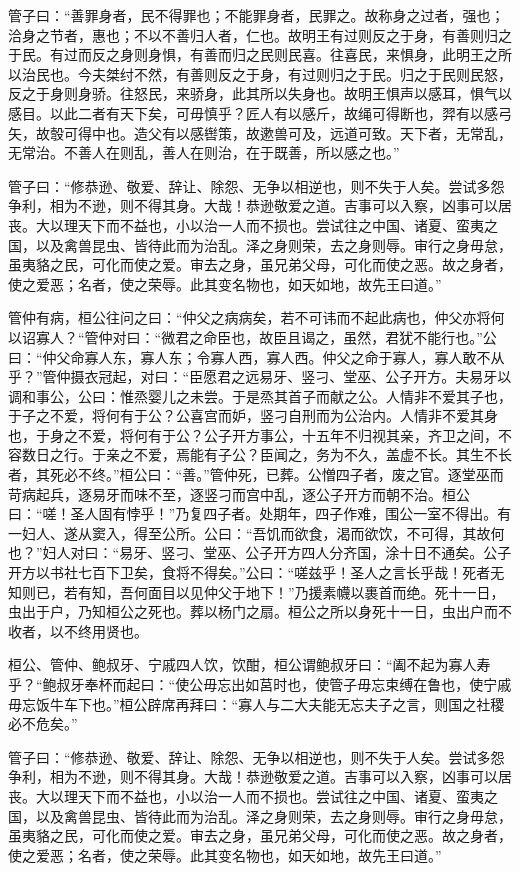 \documentclass[]{article}
\begin{document}
管子曰：``善罪身者，民不得罪也；不能罪身者，民罪之。故称身之过者，强也；洽身之节者，惠也；不以不善归人者，仁也。故明王有过则反之于身，有善则归之于民。有过而反之身则身惧，有善而归之民则民喜。往喜民，来惧身，此明王之所以治民也。今夫桀纣不然，有善则反之于身，有过则归之于民。归之于民则民怒，反之于身则身骄。往怒民，来骄身，此其所以失身也。故明王惧声以感耳，惧气以感目。以此二者有天下矣，可毋慎乎？匠人有以感斤，故绳可得断也，羿有以感弓矢，故彀可得中也。造父有以感辔策，故遬兽可及，远道可致。天下者，无常乱，无常治。不善人在则乱，善人在则治，在于既善，所以感之也。''

管子曰：``修恭逊、敬爱、辞让、除怨、无争以相逆也，则不失于人矣。尝试多怨争利，相为不逊，则不得其身。大哉！恭逊敬爱之道。吉事可以入察，凶事可以居丧。大以理天下而不益也，小以治一人而不损也。尝试往之中国、诸夏、蛮夷之国，以及禽兽昆虫、皆待此而为治乱。泽之身则荣，去之身则辱。审行之身毋怠，虽夷貉之民，可化而使之爱。审去之身，虽兄弟父母，可化而使之恶。故之身者，使之爱恶；名者，使之荣辱。此其变名物也，如天如地，故先王曰道。''

管仲有病，桓公往问之曰：``仲父之病病矣，若不可讳而不起此病也，仲父亦将何以诏寡人？``管仲对曰：``微君之命臣也，故臣且谒之，虽然，君犹不能行也。''公曰：``仲父命寡人东，寡人东；令寡人西，寡人西。仲父之命于寡人，寡人敢不从乎？''管仲摄衣冠起，对曰：``臣愿君之远易牙、竖刁、堂巫、公子开方。夫易牙以调和事公，公曰：惟烝婴儿之未尝。于是烝其首子而献之公。人情非不爱其子也，于子之不爱，将何有于公？公喜宫而妒，竖刁自刑而为公治内。人情非不爱其身也，于身之不爱，将何有于公？公子开方事公，十五年不归视其亲，齐卫之间，不容数日之行。于亲之不爱，焉能有子公？臣闻之，务为不久，盖虚不长。其生不长者，其死必不终。''桓公曰：``善。''管仲死，已葬。公憎四子者，废之官。逐堂巫而苛病起兵，逐易牙而味不至，逐竖刁而宫中乱，逐公子开方而朝不治。桓公曰：``嗟！圣人固有悖乎！''乃复四子者。处期年，四子作难，围公一室不得出。有一妇人、遂从窦入，得至公所。公曰：``吾饥而欲食，渴而欲饮，不可得，其故何也？''妇人对曰：``易牙、竖刁、堂巫、公子开方四人分齐国，涂十日不通矣。公子开方以书社七百下卫矣，食将不得矣。''公曰：``嗟兹乎！圣人之言长乎哉！死者无知则已，若有知，吾何面目以见仲父于地下！''乃援素幭以裹首而绝。死十一日，虫出于户，乃知桓公之死也。葬以杨门之扇。桓公之所以身死十一日，虫出户而不收者，以不终用贤也。

桓公、管仲、鲍叔牙、宁戚四人饮，饮酣，桓公谓鲍叔牙曰：``阖不起为寡人寿乎？``鲍叔牙奉杯而起曰：``使公毋忘出如莒时也，使管子毋忘束缚在鲁也，使宁戚毋忘饭牛车下也。''桓公辟席再拜曰：``寡人与二大夫能无忘夫子之言，则国之社稷必不危矣。''

管子曰：``修恭逊、敬爱、辞让、除怨、无争以相逆也，则不失于人矣。尝试多怨争利，相为不逊，则不得其身。大哉！恭逊敬爱之道。吉事可以入察，凶事可以居丧。大以理天下而不益也，小以治一人而不损也。尝试往之中国、诸夏、蛮夷之国，以及禽兽昆虫、皆待此而为治乱。泽之身则荣，去之身则辱。审行之身毋怠，虽夷貉之民，可化而使之爱。审去之身，虽兄弟父母，可化而使之恶。故之身者，使之爱恶；名者，使之荣辱。此其变名物也，如天如地，故先王曰道。''
\end{document}
